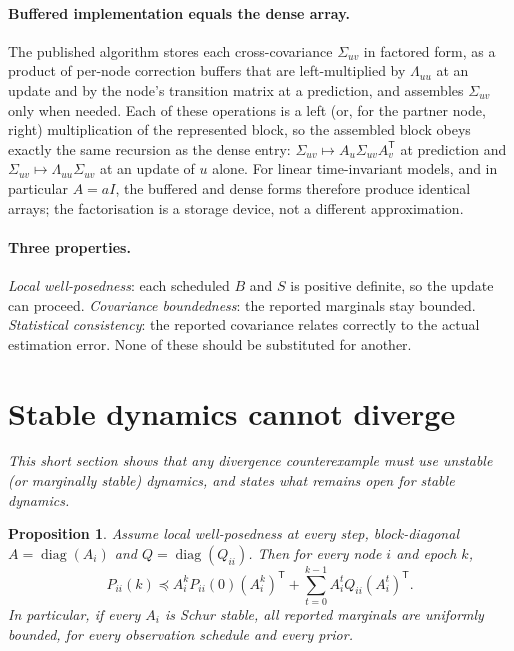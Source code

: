 \documentclass[11pt,a4paper]{article}
\numberwithin{equation}{section}
\newtheorem{proposition}[theorem]{Proposition}
\theoremstyle{remark}\newtheorem{remark}[theorem]{Remark}
\newcommand{\T}{^{\mathsf T}}
\newcommand{\diag}{\operatorname{diag}}
\begin{document}
\paragraph{Buffered implementation equals the dense array.} The published algorithm stores each
cross-covariance $\Sigma_{uv}$ in factored form, as a product of per-node correction buffers
that are left-multiplied by $\Lambda_{uu}$ at an update and by the node's transition matrix at
a prediction, and assembles $\Sigma_{uv}$ only when needed. Each of these operations is a left
(or, for the partner node, right) multiplication of the represented block, so the assembled
block obeys exactly the same recursion as the dense entry: $\Sigma_{uv}\mapsto A_u\Sigma_{uv}A_v\T$
at prediction and $\Sigma_{uv}\mapsto\Lambda_{uu}\Sigma_{uv}$ at an update of $u$ alone. For
linear time-invariant models, and in particular $A=aI$, the buffered and dense forms therefore
produce identical arrays; the factorisation is a storage device, not a different approximation.

\paragraph{Three properties.} \emph{Local well-posedness}: each scheduled $B$ and $S$ is positive
definite, so the update can proceed. \emph{Covariance boundedness}: the reported marginals stay
bounded. \emph{Statistical consistency}: the reported covariance relates correctly to the actual
estimation error. None of these should be substituted for another.

\section{Stable dynamics cannot diverge}\label{sec:stable}

\emph{This short section shows that any divergence counterexample must use unstable (or
marginally stable) dynamics, and states what remains open for stable dynamics.}

\begin{proposition}\label{prop:stable}
Assume local well-posedness at every step, block-diagonal $A=\diag(A_i)$ and $Q=\diag(Q_{ii})$.
Then for every node $i$ and epoch $k$,
\[
P_{ii}(k)\preceq A_i^kP_{ii}(0)(A_i^k)\T+\sum_{t=0}^{k-1}A_i^tQ_{ii}(A_i^t)\T .
\]
In particular, if every $A_i$ is Schur stable, all reported marginals are uniformly bounded,
for every observation schedule and every prior.
\end{proposition}
\end{document}
